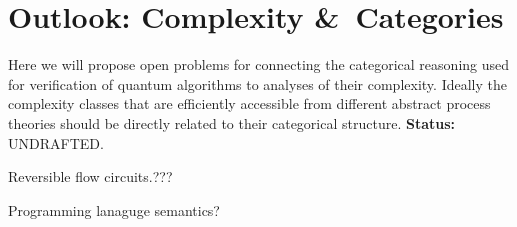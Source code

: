 \chapter{Outlook: Complexity \&\ Categories}
\label{chap:outlook}

Here we will propose open problems for connecting the categorical reasoning used for verification of quantum algorithms to analyses of their complexity.  Ideally the complexity classes that are efficiently accessible from different abstract process theories should be directly related to their categorical structure. {\bf Status:} UNDRAFTED.

Reversible flow circuits.???

Programming lanaguge semantics?

